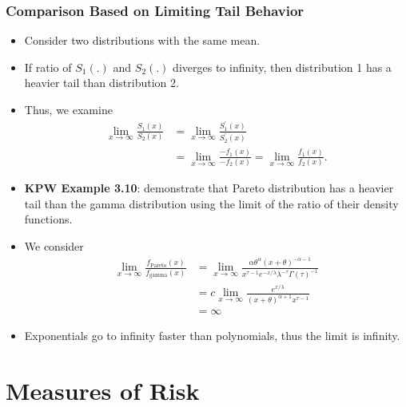 \documentclass[]{book}
\begin{document}
\subsubsection{Comparison Based on Limiting Tail
Behavior}\label{comparison-based-on-limiting-tail-behavior}

\begin{itemize}
\item
  Consider two distributions with the same mean.
\item
  If ratio of \(S_1(.)\) and \(S_2(.)\) diverges to infinity, then
  distribution 1 has a heavier tail than distribution 2.
\item
  Thus, we examine \[\begin{aligned}
  \lim_{x\to \infty} \frac{S_1(x)}{S_2(x)} &= \lim_{x \to \infty} \frac{S_1^{'}(x)}{S_2^{'}(x)} \\
  &= \lim_{x \to \infty} \frac{-f_1(x)}{-f_2(x)} = \lim_{x\to \infty} \frac{f_1(x)}{f_2(x)}.\end{aligned}\]
\item
  \textbf{KPW Example 3.10}: demonstrate that Pareto distribution has a
  heavier tail than the gamma distribution using the limit of the ratio
  of their density functions.
\item
  We consider \[\begin{aligned}
  \lim_{x\to \infty} \frac{f_{\text{Pareto}}(x)}{f_{\text{gamma}}(x)} &= \lim_{x \to \infty} \frac{\alpha \theta^{\alpha} (x+ \theta)^{-\alpha-1}}{x^{\tau-1} e^{-x/\lambda} \lambda^{-\tau} \Gamma(\tau)^{-1}} \\
  &= c \lim_{x\to \infty} \frac{e^{x/\lambda}}{(x+\theta)^{\alpha+1} x^{\tau-1}} \\
  &= \infty\end{aligned}\]
\item
  Exponentials go to infinity faster than polynomials, thus the limit is
  infinity.
\end{itemize}

\section{Measures of Risk}\label{measures-of-risk}
\end{document}
